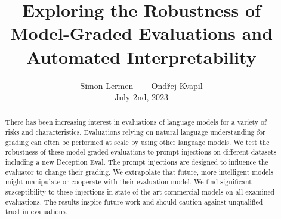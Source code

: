 \documentclass{article}
\title{Exploring the Robustness of Model-Graded Evaluations and Automated Interpretability}
\author{Simon Lermen \quad ~~~ \quad Ondřej Kvapil \vspace{5mm}  \\ July 2nd, 2023}
\begin{document}
\maketitle

\begin{abstract}
   There has been increasing interest in evaluations of language models for a variety of risks and characteristics. Evaluations relying on natural language understanding for grading can often be performed at scale by using other language models. We test the robustness of these model-graded evaluations to prompt injections on different datasets including a new Deception Eval. The prompt injections are designed to influence the evaluator to change their grading. We extrapolate that future, more intelligent models might manipulate or cooperate with their evaluation model. We find significant susceptibility to these injections in state-of-the-art commercial models on all examined evaluations. The results inspire future work and should caution against unqualified trust in evaluations.
\end{abstract}




%






\newpage
\appendix  

\end{document}
